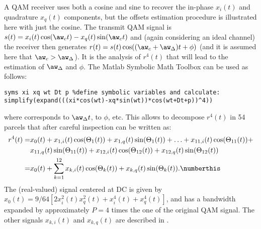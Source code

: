 A QAM receiver uses both a cosine and sine to recover the in-phase $x_i(t)$ and quadrature $x_q(t)$ components, but the offsets estimation procedure is illustrated here with just the cosine.
The transmit QAM signal is 
$s(t) = x_i(t) \cos(\aw_c t) - x_q(t) \sin(\aw_c t)$ and (again considering an ideal channel) the
receiver then generates $r(t) = s(t) \cos((\aw_c +\aw_{\Delta}) t + \phi)$ (and it is assumed here that $\aw_c > \aw_{\Delta}$).
It is the analysis of $r^4(t)$ that will lead to the estimation of $\aw_{\Delta}$ and $\phi$.
The Matlab Symbolic Math Toolbox can be used as follows:
\begin{lstlisting}
syms xi xq wt Dt p %define symbolic variables and calculate:
simplify(expand(((xi*cos(wt)-xq*sin(wt))*cos(wt+Dt+p))^4))
\end{lstlisting}
where  corresponds to $\aw_{\Delta} t$,  to $\phi$, etc. This allows to decompose $r^4(t)$ in 54 parcels that after careful inspection can be written as:
\begin{align*}
r^4(t) =& x_0(t) + x_{1,i}(t) \cos(\Theta_1(t)) + x_{1,q}(t) \sin(\Theta_1(t)) + \ldots + x_{11,i}(t) \cos(\Theta_{11}(t)) +  \\
& x_{11,q}(t) \sin(\Theta_{11}(t)) + x_{12,i}(t) \cos(\Theta_{12}(t)) + x_{12,q}(t) \sin(\Theta_{12}(t)) \\
=& x_0(t) + \sum_{k=1}^{12} x_{k,i}(t) \cos(\Theta_{k}(t)) + x_{k,q}(t) \sin(\Theta_{k}(t)). \numberthis
\label{eq:qamToTheFourth}
\end{align*}
The (real-valued) signal centered at DC is given by $x_0(t) = 9/64[2x_i^2(t)x_q^2(t) + x_i^4(t) + x_q^4(t)]$, and has a bandwidth expanded by approximately $P=4$ times the one of the original QAM signal.
The other signals $x_{k,i}(t)$ and $x_{k,q}(t)$ are described in . 

